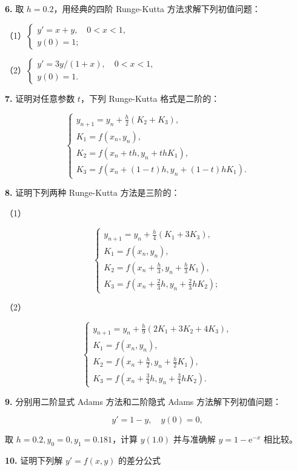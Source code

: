 \documentclass[
  10pt,
  fontset=fandol]{ctexart}
\begin{document}
\textbf{6.} 取 \(h=0.2\)，用经典的四阶 Runge-Kutta 方法求解下列初值问题：

（1）\(\begin{cases}y'=x+y,\quad0<x<1,\\y(0)=1;\end{cases}\)

（2）\(\begin{cases}y'=3y/(1+x),\quad0<x<1,\\y(0)=1.\end{cases}\)

\textbf{7.} 证明对任意参数 \(t\)，下列 Runge-Kutta 格式是二阶的：

\[
\begin{cases}
\displaystyle y_{n+1}=y_n+\frac h2(K_2+K_3),\\[6pt]
K_1=f(x_n,y_n),\\
K_2=f(x_n+th,y_n+thK_1),\\
K_3=f(x_n+(1-t)h,y_n+(1-t)hK_1).
\end{cases}
\]

\textbf{8.} 证明下列两种 Runge-Kutta 方法是三阶的：

（1）

\[
\begin{cases}
\displaystyle y_{n+1}=y_n+\frac h4(K_1+3K_3),\\[6pt]
K_1=f(x_n,y_n),\\
\displaystyle K_2=f\left(x_n+\frac h3,y_n+\frac h3K_1\right),\\[4pt]
\displaystyle K_3=f\left(x_n+\frac23h,y_n+\frac23hK_2\right);
\end{cases}
\]

（2）

\[
\begin{cases}
\displaystyle y_{n+1}=y_n+\frac h9(2K_1+3K_2+4K_3),\\[6pt]
K_1=f(x_n,y_n),\\
\displaystyle K_2=f\left(x_n+\frac h2,y_n+\frac h2K_1\right),\\[4pt]
\displaystyle K_3=f\left(x_n+\frac34h,y_n+\frac34hK_2\right).
\end{cases}
\]

\textbf{9.} 分别用二阶显式 Adams 方法和二阶隐式 Adams 方法解下列初值问题：

\[
y'=1-y,\quad y(0)=0,
\]

取 \(h=0.2,y_0=0,y_1=0.181\)，计算 \(y(1.0)\) 并与准确解 \(y=1-\mathrm e^{-x}\) 相比较。

\textbf{10.} 证明下列解 \(y'=f(x,y)\) 的差分公式
\end{document}
